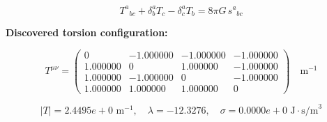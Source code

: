
\begin{equation}
  T^a{}_{bc} + \delta^a_b T_c - \delta^a_c T_b = 8\pi G \, s^a{}_{bc}
\end{equation}

\textbf{Discovered torsion configuration:}

\begin{equation}
  T^{\mu\nu} = \begin{pmatrix}
    0 & -1.000000 & -1.000000 & -1.000000 \\
    1.000000 & 0 & 1.000000 & -1.000000 \\
    1.000000 & -1.000000 & 0 & -1.000000 \\
    1.000000 & 1.000000 & 1.000000 & 0
  \end{pmatrix} \quad \text{m}^{-1}
\end{equation}

\begin{equation}
  |T| = 2.4495e+0 \text{ m}^{-1}, \quad
  \lambda = -12.3276, \quad
  \sigma = 0.0000e+0 \text{ J}\cdot\text{s/m}^3
\end{equation}